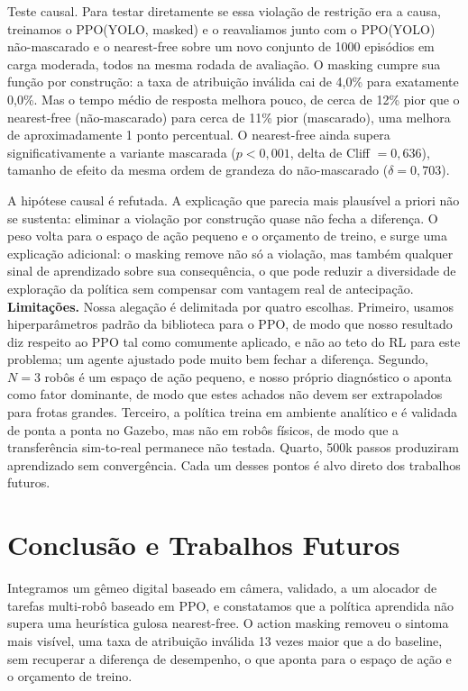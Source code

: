 \documentclass[conference]{IEEEtran}
\begin{document}
Teste causal. Para testar diretamente se essa violação de restrição era a causa, treinamos o PPO(YOLO, masked) e o reavaliamos junto com o PPO(YOLO) não-mascarado e o nearest-free sobre um novo conjunto de 1000 episódios em carga moderada, todos na mesma rodada de avaliação. O masking cumpre sua função por construção: a taxa de atribuição inválida cai de 4,0\% para exatamente 0,0\%. Mas o tempo médio de resposta melhora pouco, de cerca de 12\% pior que o nearest-free (não-mascarado) para cerca de 11\% pior (mascarado), uma melhora de aproximadamente 1 ponto percentual. O nearest-free ainda supera significativamente a variante mascarada ($p<0,001$, delta de Cliff $=0,636$), tamanho de efeito da mesma ordem de grandeza do não-mascarado ($\delta=0,703$).

A hipótese causal é refutada. A explicação que parecia mais plausível a priori não se sustenta: eliminar a violação por construção quase não fecha a diferença. O peso volta para o espaço de ação pequeno e o orçamento de treino, e surge uma explicação adicional: o masking remove não só a violação, mas também qualquer sinal de aprendizado sobre sua consequência, o que pode reduzir a diversidade de exploração da política sem compensar com vantagem real de antecipação. \textbf{Limitações.} Nossa alegação é delimitada por quatro escolhas. Primeiro, usamos hiperparâmetros padrão da biblioteca para o PPO, de modo que nosso resultado diz respeito ao PPO tal como comumente aplicado, e não ao teto do RL para este problema; um agente ajustado pode muito bem fechar a diferença. Segundo, $N=3$ robôs é um espaço de ação pequeno, e nosso próprio diagnóstico o aponta como fator dominante, de modo que estes achados não devem ser extrapolados para frotas grandes. Terceiro, a política treina em ambiente analítico e é validada de ponta a ponta no Gazebo, mas não em robôs físicos, de modo que a transferência sim-to-real permanece não testada. Quarto, 500k passos produziram aprendizado sem convergência. Cada um desses pontos é alvo direto dos trabalhos futuros.

\section{Conclusão e Trabalhos Futuros}

Integramos um gêmeo digital baseado em câmera, validado, a um alocador de tarefas multi-robô baseado em PPO, e constatamos que a política aprendida não supera uma heurística gulosa nearest-free. O action masking removeu o sintoma mais visível, uma taxa de atribuição inválida 13 vezes maior que a do baseline, sem recuperar a diferença de desempenho, o que aponta para o espaço de ação e o orçamento de treino.
\end{document}
